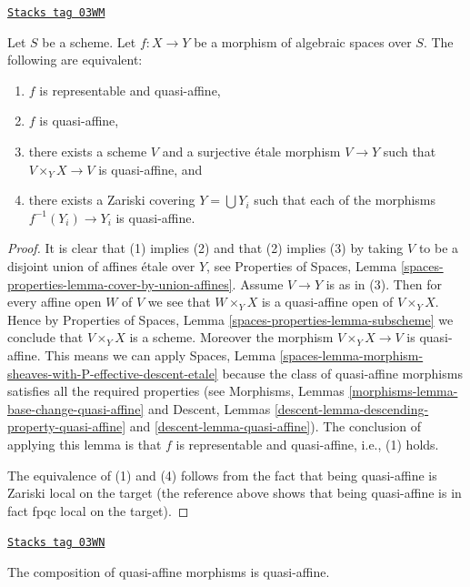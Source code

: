\begin{lemma}
\label{spaces-morphisms-lemma-quasi-affine-local}
\href{https://stacks.math.columbia.edu/tag/03WM}{\texttt{Stacks tag 03WM}}

Let $S$ be a scheme.
Let $f : X \to Y$ be a morphism of algebraic spaces over $S$.
The following are equivalent:
\begin{enumerate}
\item $f$ is representable and quasi-affine,
\item $f$ is quasi-affine,
\item there exists a scheme $V$ and a surjective \'etale morphism
$V \to Y$ such that $V \times_Y X \to V$ is quasi-affine, and
\item there exists a Zariski covering $Y = \bigcup Y_i$ such
that each of the morphisms $f^{-1}(Y_i) \to Y_i$ is quasi-affine.
\end{enumerate}
\end{lemma}

\begin{proof}
It is clear that (1) implies (2) and that (2) implies (3) by taking
$V$ to be a disjoint union of affines \'etale over $Y$, see
Properties of Spaces,
Lemma \ref{spaces-properties-lemma-cover-by-union-affines}.
Assume $V \to Y$ is as in (3). Then for every affine open $W$ of $V$ we see
that $W \times_Y X$ is a quasi-affine open of $V \times_Y X$. Hence by
Properties of Spaces, Lemma \ref{spaces-properties-lemma-subscheme}
we conclude that $V \times_Y X$ is a scheme. Moreover the morphism
$V \times_Y X \to V$ is quasi-affine. This means we can apply
Spaces,
Lemma \ref{spaces-lemma-morphism-sheaves-with-P-effective-descent-etale}
because the class of quasi-affine morphisms satisfies all the required
properties (see
Morphisms, Lemmas \ref{morphisms-lemma-base-change-quasi-affine} and
Descent, Lemmas \ref{descent-lemma-descending-property-quasi-affine}
and \ref{descent-lemma-quasi-affine}). The conclusion of applying this lemma
is that $f$ is representable and quasi-affine, i.e., (1) holds.

\medskip\noindent
The equivalence of (1) and (4) follows from the fact that being
quasi-affine is Zariski local on the target (the reference above shows
that being quasi-affine is in fact fpqc local on the target).
\end{proof}

\begin{lemma}
\label{spaces-morphisms-lemma-composition-quasi-affine}
\href{https://stacks.math.columbia.edu/tag/03WN}{\texttt{Stacks tag 03WN}}

The composition of quasi-affine morphisms is quasi-affine.
\end{lemma}

